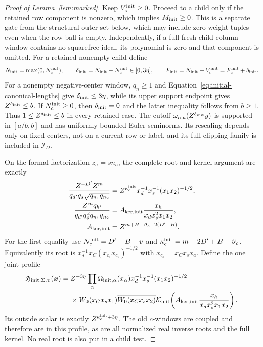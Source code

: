 \documentclass[12pt]{article}
\begin{document}
\begin{proof}[Proof of Lemma~\ref{lem:marked}]
Keep \(V_c^{\rm init}\ge0\).  Proceed to a child only if the retained
row component is nonzero, which implies \(M_{\rm init}\ge0\).
This is a separate gate from the structural outer set below, which
may include zero-weight tuples even when the row ball is empty.
Independently, if a full fresh child column window contains no
squarefree ideal, its polynomial is zero and that component is omitted.
For a retained nonempty child define
\[
 N_{\rm init}=\max(0,N_c^{\rm init}),\qquad
 \delta_{\rm init}=N_{\rm init}-N_c^{\rm init}\in[0,3\eta],\qquad
 F_{\rm init}=N_{\rm init}+V_c^{\rm init}=F_c^{\rm init}+\delta_{\rm init}.
\]
For a nonempty negative-center window, \(q_n\ge1\) and
Equation~\eqref{eq:initial-canonical-lengths} give
\(\delta_{\rm init}\le3\eta\), while its upper support endpoint gives
\(Z^{\delta_{\rm init}}\le b\).  If \(N_c^{\rm init}\ge0\), then
\(\delta_{\rm init}=0\) and the latter inequality follows from \(b\ge1\).
Thus \(1\le Z^{\delta_{\rm init}}\le b\) in every retained case.
The cutoff \(\omega_{n,a}(Z^{\delta_{\rm init}}y)\) is supported in
\([a/b,b]\) and has uniformly bounded Euler seminorms.  Its rescaling
depends only on fixed centers, not on a current row or label, and its
full clipping family is included in \(\mathcal I_D\).

On the formal factorization \(z_a=sn_a\), the complete root and
kernel argument are exactly
\begin{equation}\label{eq:initial-root-kernel}
 \begin{split}
 \frac{Z^{-D'}Z^m}{q_{d'}q_s\sqrt{q_{n_1}q_{n_2}}}
 &=Z^{\kappa_c^{\rm init}}x_d^{-1}x_s^{-1}(x_1x_2)^{-1/2},\\
 \frac{Z^mq_{h'}}{q_{d'}q_s^2q_{n_1}q_{n_2}}
 &=A_{{\rm ker},{\rm init}}\frac{x_h}{x_dx_s^2x_1x_2},\\
 A_{{\rm ker},{\rm init}}&=Z^{m+H-\vartheta_c-2(D'-B)}.
 \end{split}
\end{equation}
For the first equality use \(N_c^{\rm init}=D'-B-v\) and
\(\kappa_c^{\rm init}=m-2D'+B-\vartheta_c\).  Equivalently its root is
\(x_d^{-1}x_C(x_{c_1}x_{c_2})^{-1/2}\) with
\(x_{c_a}=x_Cx_sx_a\).  Define the one joint profile
\begin{equation}\label{eq:initial-joint-profile}
 \begin{split}
 \mathfrak H_{{\rm init},\Sigma,\boldsymbol\upsilon}(\boldsymbol x)
 ={}&Z^{-3\eta}\prod_\alpha\Omega_{{\rm init},\alpha}(x_\alpha)
 x_d^{-1}x_s^{-1}(x_1x_2)^{-1/2}\\
 &\times W_0(x_Cx_sx_1)\overline{W_0(x_Cx_sx_2)}
 \mathcal K_{\rm init}\!\left(
 A_{{\rm ker},{\rm init}}\frac{x_h}{x_dx_s^2x_1x_2}\right).
 \end{split}
\end{equation}
Its outside scalar is exactly \(Z^{\kappa_c^{\rm init}+3\eta}\).
The old \(c\)-windows are coupled and therefore are in this profile,
as are all normalized real inverse roots and the full kernel.  No
real root is also put in a child test.


\end{proof}
\end{document}
